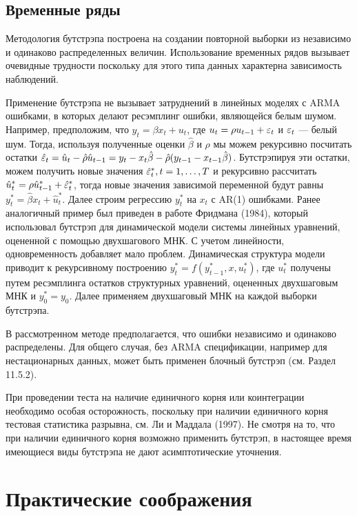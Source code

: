 \subsection{Временные ряды}

Методология бутстрэпа построена на создании повторной выборки из независимо и одинаково распределенных величин. Использование временных рядов вызывает очевидные трудности поскольку для этого типа данных характерна зависимость наблюдений.

Применение бутстрэпа не вызывает затруднений в линейных моделях с ARMA ошибками, в которых делают ресэмплинг ошибки, являющейся белым шумом. Например, предположим, что $y_t=\beta{x}_t+u_t$, где $u_t=\rho{u}_{t-1} + \varepsilon_t$ и $\varepsilon_t$ --- белый шум. Тогда, используя полученные оценки $\hat{\beta}$ и $\rho$ мы можем рекурсивно посчитать остатки $\hat{\varepsilon}_t=\hat{u}_t-\hat{\rho} \hat{u}_{t-1}=y_t-x_{t}\hat{\beta}-\hat{\rho}(y_{t-1}-x_{t-1}\hat{\beta})$. Бутстрэпируя эти остатки, можем получить новые значения $\hat{\varepsilon}^{*}_{t},t=1,\ldots ,T$ и рекурсивно рассчитать $\hat{u}^{*}_{t}=\rho\hat{u}^{*}_{t-1}+\hat{\varepsilon}^{*}_{t}$, тогда новые значения зависимой переменной будут равны $y^{*}_{t}=\hat{\beta}x_{t}+\hat{u}^{*}_{t}$. Далее строим регрессию $y^*_t$ на $x_t$ с AR(1) ошибками. Ранее аналогичный пример был приведен в работе Фридмана (1984), который использовал бутстрэп для динамической модели системы линейных уравнений, оцененной с помощью двухшагового МНК. С учетом линейности, одновременность добавляет мало проблем. Динамическая структура модели приводит к рекурсивному построению  $y^{*}_t=f(y^{*}_{t-1},x,u^{*}_t)$, где $u^{*}_t$ получены путем ресэмплинга остатков структурных уравнений, оцененных двухшаговым МНК и $y^{*}_0=y_0$. Далее применяем двухшаговый МНК на каждой выборки бутстрэпа.

В рассмотренном методе предполагается, что ошибки  независимо и одинаково распределены. Для общего случая, без ARMA спецификации, например для  нестационарных данных, может быть применен блочный бутстрэп (см. Раздел 11.5.2).

При проведении теста на наличие единичного корня или коинтеграции необходимо особая осторожность, поскольку при наличии единичного корня тестовая статистика разрывна, см. Ли и Маддала (1997). Не смотря на то, что при наличии единичного корня возможно применить бутстрэп, в настоящее время имеющиеся виды бутстрэпа не дают асимптотические уточнения.

\section{Практические соображения}


